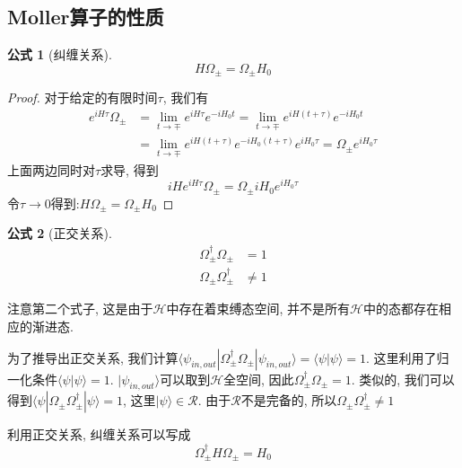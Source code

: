 \documentclass[a4paper,11pt]{book}
\newtheorem{proof}{证明}[section]
\newtheorem{formula}{公式}[section]
\begin{document}
\subsection{Moller算子的性质}
\begin{formula}[纠缠关系]
  \begin{equation}\label{interwining relation}
    H\Omega_{\pm}=\Omega_{\pm}H_{0}
  \end{equation}
\end{formula}
\begin{proof}
  对于给定的有限时间$\tau$, 我们有
  \begin{equation}
    \begin{split}
       e^{iH\tau}\Omega_{\pm}&=\lim_{t\to\mp}e^{iH\tau}e^{-iH_0t}=\lim_{t\to\mp}e^{iH(t+\tau)}e^{-iH_0t}\\
         &=\lim_{t\to\mp}e^{iH(t+\tau)}e^{-iH_0(t+\tau)}e^{iH_0\tau}=\Omega_{\pm}e^{iH_0\tau}
    \end{split}
  \end{equation}
  上面两边同时对$\tau$求导, 得到
  \begin{equation}
    iHe^{iH\tau}\Omega_{\pm}=\Omega_{\pm}iH_0e^{iH_0\tau}
  \end{equation}
  令$\tau\to0$得到:$H\Omega_{\pm}=\Omega_{\pm}H_0$
\end{proof}
\begin{formula}[正交关系]
  \begin{equation}
    \begin{split}
     \Omega_{\pm}^\dag\Omega_{\pm} & =1 \\
     \Omega_{\pm}\Omega_{\pm}^\dag & \neq1
    \end{split}
  \end{equation}
\end{formula}
注意第二个式子, 这是由于$\mathcal{H}$中存在着束缚态空间, 并不是所有$\mathcal{H}$中的态都存在相应的渐进态.

为了推导出正交关系, 我们计算$\langle\psi_{in,out}|\Omega_{\pm}^\dag\Omega_{\pm}|\psi_{in,out}\rangle=\langle\psi|\psi\rangle=1$. 这里利用了归一化条件$\langle\psi|\psi\rangle=1$. $|\psi_{in,out}\rangle$可以取到$\mathcal{H}$全空间, 因此$\Omega_{\pm}^\dag\Omega_{\pm}=1$. 类似的, 我们可以得到$\langle\psi|\Omega_\pm\Omega_\pm^\dag|\psi\rangle=1$, 这里$|\psi\rangle\in\mathcal{R}$. 由于$\mathcal{R}$不是完备的, 所以$\Omega_\pm\Omega_\pm^\dag\neq1$

利用正交关系, 纠缠关系可以写成
\begin{equation}
  \Omega_{\pm}^\dag H\Omega_\pm=H_0
\end{equation}
\end{document}

